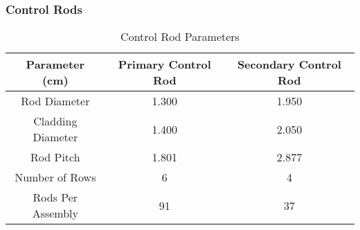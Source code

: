 \documentclass[11pt]{article}
\begin{document}
\subsubsection{Control Rods}

\begin{table}
    \centering
    \caption{Control Rod Parameters}
    \begin{tabular}{ccc}
        \toprule
        \bottomrule
        Parameter (cm) & Primary Control Rod & Secondary Control Rod\\
        \toprule
        \bottomrule
        Rod Diameter & 1.300 & 1.950 \\
        Cladding Diameter & 1.400 & 2.050\\
        Rod Pitch & 1.801 & 2.877\\
        Number of Rows & 6 & 4 \\
        Rods Per Assembly & 91 & 37
    \end{tabular}
\end{table}
\end{document}
